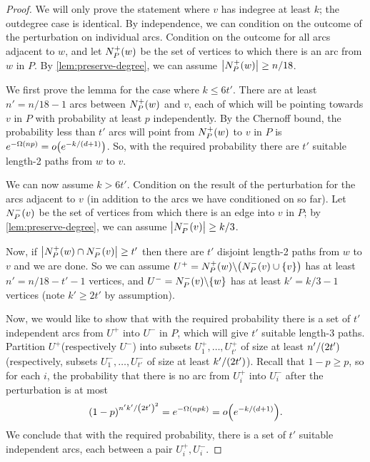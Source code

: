 \documentclass[11pt,english]{article}
\theoremstyle{plain}
\theoremstyle{definition}
\theoremstyle{definition}
\theoremstyle{plain}
\theoremstyle{plain}
\theoremstyle{plain}
\theoremstyle{plain}
\theoremstyle{remark}
\theoremstyle{remark}
\let\originalleft\left
\let\originalright\right
\renewcommand{\left}{\mathopen{}\mathclose\bgroup\originalleft}
\renewcommand{\right}{\aftergroup\egroup\originalright}
\begin{document}
\begin{proof}
We will only prove the statement where $v$ has indegree at least
$k$; the outdegree case is identical. By independence, we can condition
on the outcome of the perturbation on individual arcs. Condition on
the outcome for all arcs adjacent to $w$, and let $N_{P}^{+}\left(w\right)$
be the set of vertices to which there is an arc from $w$ in $P$.
By \ref{lem:preserve-degree}, we can assume $\left|N_{P}^{+}\left(w\right)\right|\ge n/18$.

We first prove the lemma for the case where $k\le6t'$. There are
at least $n'=n/18-1$ arcs between $N_{P}^{+}\left(w\right)$ and
$v$, each of which will be pointing towards $v$ in $P$ with probability
at least $p$ independently. By the Chernoff bound, the probability
less than $t'$ arcs will point from $N_{P}^{+}\left(w\right)$ to
$v$ in $P$ is $e^{-\Omega\left(np\right)}=o\left(e^{-k/\left(d+1\right)}\right)$.
So, with the required probability there are $t'$ suitable length-2
paths from $w$ to $v$.

We can now assume $k>6t'$. Condition on the result of the perturbation
for the arcs adjacent to $v$ (in addition to the arcs we have conditioned
on so far). Let $N_{P}^{-}\left(v\right)$ be the set of vertices
from which there is an edge into $v$ in $P$; by \ref{lem:preserve-degree},
we can assume $\left|N_{P}^{-}\left(v\right)\right|\ge k/3$.

Now, if $\left|N_{P}^{+}\left(w\right)\cap N_{P}^{-}\left(v\right)\right|\ge t'$
then there are $t'$ disjoint length-2 paths from $w$ to $v$ and
we are done. So we can assume $U^{+}=N_{P}^{+}\left(w\right)\backslash\left(N_{P}^{-}\left(v\right)\cup\left\{ v\right\} \right)$
has at least $n'=n/18-t'-1$ vertices, and $U^{-}=N_{P}^{-}\left(v\right)\backslash\left\{ w\right\} $
has at least $k'=k/3-1$ vertices (note $k'\ge 2t'$ by assumption).

Now, we would like to show that with the required probability there
is a set of $t'$ independent arcs from $U^{+}$ into $U^{-}$ in
$P$, which will give $t'$ suitable length-3 paths. Partition $U^{+}$(respectively
$U^{-}$) into subsets $U_{1}^{+},\dots,U_{t'}^{+}$ of size at least
$n'/\left(2t'\right)$ (respectively, subsets $U_{1}^{-},\dots,U_{t'}^{-}$
of size at least $k'/\left(2t'\right)$). Recall that $1-p\ge p$, so for each $i$, the probability
that there is no arc from $U_{i}^{+}$ into $U_{i}^{-}$ after the
perturbation is at most 
\[
\left(1-p\right)^{n'k'/\left(2t'\right)^{2}}=e^{-\Omega\left(npk\right)}=o\left(e^{-k/\left(d+1\right)}\right).
\]
We conclude that with the required probability, there is a set of $t'$ suitable independent
arcs, each between a pair $U_{i}^{+},U_{i}^{-}$.\end{proof}
\end{document}
